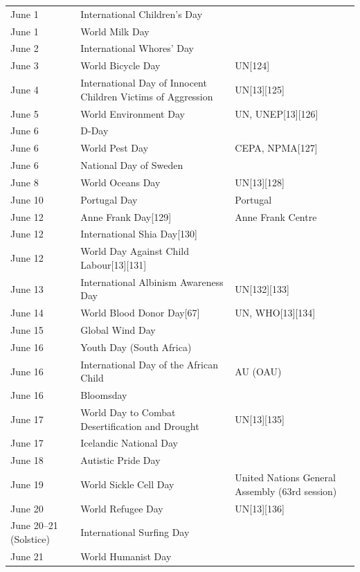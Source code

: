 \documentclass[
  openany]{book}
\begin{document}
\begin{longtable}[t]{>{\raggedright\arraybackslash}p{8em}>{\raggedright\arraybackslash}p{20em}>{\raggedright\arraybackslash}p{12em}}
June 1 & International Children's Day & \\
\rowcolor{gray!6}  June 1 & World Milk Day & \\
June 2 & International Whores' Day & \\
\rowcolor{gray!6}  June 3 & World Bicycle Day & UN[124]\\
June 4 & International Day of Innocent Children Victims of Aggression & UN[13][125]\\
\addlinespace
\rowcolor{gray!6}  June 5 & World Environment Day & UN, UNEP[13][126]\\
June 6 & D-Day & \\
\rowcolor{gray!6}  June 6 & World Pest Day & CEPA, NPMA[127]\\
June 6 & National Day of Sweden & \\
\rowcolor{gray!6}  June 8 & World Oceans Day & UN[13][128]\\
\addlinespace
June 10 & Portugal Day & Portugal\\
\rowcolor{gray!6}  June 12 & Anne Frank Day[129] & Anne Frank Centre\\
June 12 & International Shia Day[130] & \\
\rowcolor{gray!6}  June 12 & World Day Against Child Labour[13][131] & \\
June 13 & International Albinism Awareness Day & UN[132][133]\\
\addlinespace
\rowcolor{gray!6}  June 14 & World Blood Donor Day[67] & UN, WHO[13][134]\\
June 15 & Global Wind Day & \\
\rowcolor{gray!6}  June 16 & Youth Day (South Africa) & \\
June 16 & International Day of the African Child & AU (OAU)\\
\rowcolor{gray!6}  June 16 & Bloomsday & \\
\addlinespace
June 17 & World Day to Combat Desertification and Drought & UN[13][135]\\
\rowcolor{gray!6}  June 17 & Icelandic National Day & \\
June 18 & Autistic Pride Day & \\
\rowcolor{gray!6}  June 19 & World Sickle Cell Day & United Nations General Assembly (63rd session)\\
June 20 & World Refugee Day & UN[13][136]\\
\addlinespace
\rowcolor{gray!6}  June 20–21 (Solstice) & International Surfing Day & \\
June 21 & World Humanist Day & \\

\end{longtable}
\end{document}
